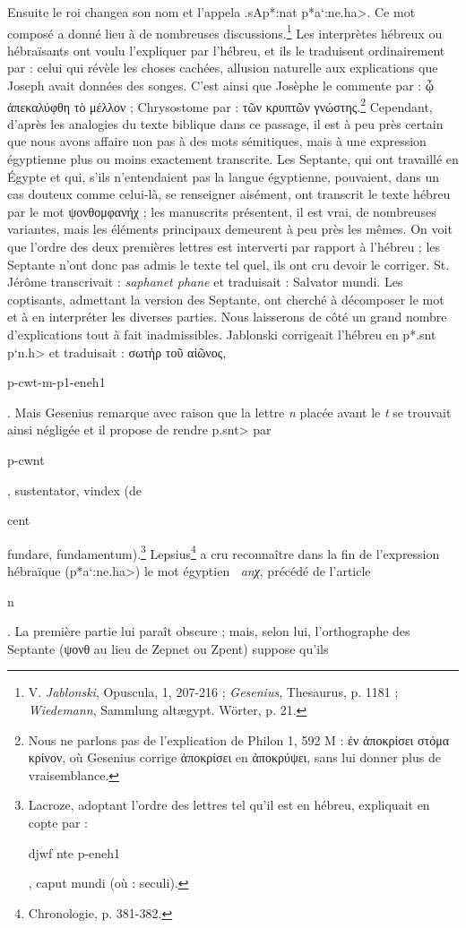 \documentclass[letterpaper,twocolumn,openany,nodeprecatedcode]{dndbook}
\newcommand*\hieroAADL{}
\newcommand*\hieroAARZ{}
\newcommand*\hieroAATN{}
\begin{document}
Ensuite le roi changea son nom et l'appela \foreignlanguage{hebrew}{\<.sAp*:nat p*a`:ne.ha>}. Ce mot composé a donné lieu à de nombreuses discussions.\footnote{V. \emph{Jablonski}, Opuscula, 1, 207-216 ; \emph{Gesenius}, Thesaurus, p. 1181 ; \emph{Wiedemann}, Sammlung altægypt. Wörter, p. 21.} Les interprètes hébreux ou hébraïsants ont voulu l'expliquer par l'hébreu, et ils le traduisent ordinairement par : celui qui révèle les choses cachées, allusion naturelle aux explications que Joseph avait données des songes. C'est ainsi que Josèphe le commente par : ᾧ ἀπεκαλύφθη τὸ μέλλον ; Chrysostome par : τῶν κρυπτῶν γνώστης.\footnote{Nous ne parlons pas de l'explication de Philon 1, 592 M : ἐν ἀποκρίσει στόμα κρίνον, où Gesenius corrige ἀποκρίσει en ἀποκρύψει, sans lui donner plus de vraisemblance.} Cependant, d'après les analogies du texte biblique dans ce passage, il est à peu près certain que nous avons affaire non pas à des mots sémitiques, mais à une expression égyptienne plus ou moins exactement transcrite. Les Septante, qui ont travaillé en Égypte et qui, s'ils n'entendaient pas la langue égyptienne, pouvaient, dans un cas douteux comme celui-là, se renseigner aisément, ont transcrit le texte hébreu par le mot ψονθομφανήχ ; les manuscrits présentent, il est vrai, de nombreuses variantes, mais les éléments principaux demeurent à peu près les mêmes. On voit que l'ordre des deux premières lettres est interverti par rapport à l'hébreu ; les Septante n'ont donc pas admis le texte tel quel, ils ont cru devoir le corriger. St. Jérôme transcrivait : \emph{saphanet phane} et traduisait : Salvator mundi. Les coptisants, admettant la version des Septante, ont cherché à décomposer le mot et à en interpréter les diverses parties. Nous laisserons de côté un grand nombre d'explications tout à fait inadmissibles. Jablonski corrigeait l'hébreu en \foreignlanguage{hebrew}{\<p*.snt p`n.h>} et traduisait : σωτὴρ τοῦ αἰῶνος, \begin{coptic}p-cwt-m-p1-eneh1\end{coptic}. Mais Gesenius remarque avec raison que la lettre \emph{n} placée avant le \emph{t} se trouvait ainsi négligée et il propose de rendre \foreignlanguage{hebrew}{\<p.snt>} par \begin{coptic}p-cwnt\end{coptic}, sustentator, vindex (de \begin{coptic}cent\end{coptic} fundare, fundamentum).\footnote{Lacroze, adoptant l'ordre des lettres tel qu'il est en hébreu, expliquait en copte par : \begin{coptic}djwf nte p-eneh1\end{coptic}, caput mundi (où : seculi).} Lepsius\footnote{Chronologie, p. 381-382.} a cru reconnaître dans la fin de l'expression hébraïque (\foreignlanguage{hebrew}{\<p*a`:ne.ha>}) le mot égyptien $\hieroAARZ\:\hieroAATN$ \emph{anχ}, précédé de l'article $\hieroAADL$ \begin{coptic}n\end{coptic}. La première partie lui paraît obscure ; mais, selon lui, l'orthographe des Septante (ψονθ au lieu de Zepnet ou Zpent) suppose qu'ils 
\end{document}
